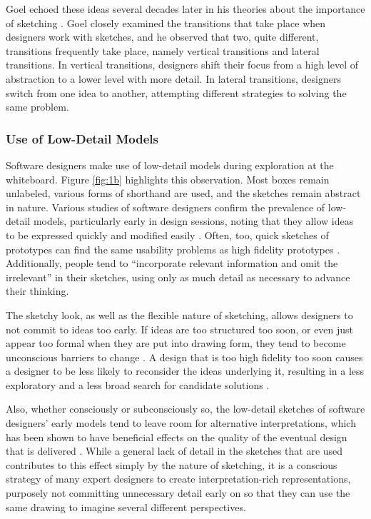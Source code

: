 Goel echoed these ideas several decades later in his theories about the importance of sketching \citep{Goel}. Goel closely examined the transitions that take place when designers work with sketches, and he observed that two, quite different, transitions frequently take place, namely vertical transitions and lateral transitions. In vertical transitions, designers shift their focus from a high level of abstraction to a lower level with more detail. In lateral transitions, designers switch from one idea to another, attempting different strategies to solving the same problem.

\subsubsection{Use of Low-Detail Models}
\label{behaviorsofsoftwaredesignerswhilesketching:2}
Software designers make use of low-detail models during exploration at the whiteboard. Figure \ref{fig:1b} highlights this observation. Most boxes remain unlabeled, various forms of shorthand are used, and the sketches remain abstract in nature. Various studies of software designers confirm the prevalence of low-detail models, particularly early in design sessions, noting that they allow ideas to be expressed quickly and modified easily \citep{cherubini2007let,petre2009insights}. Often, too, quick sketches of prototypes can find the same usability problems as high fidelity prototypes \citep{virzi1996usability}. Additionally, people tend to ``incorporate relevant information and omit the irrelevant'' \citep{tversky2002sketches} in their sketches, using only as much detail as necessary to advance their thinking.

The sketchy look, as well as the flexible nature of sketching, allows designers to not commit to ideas too early. If ideas are too structured too soon, or even just appear too formal when they are put into drawing form, they tend to become unconscious barriers to change \citep{wong1992rough}. A design that is too high fidelity too soon causes a designer to be less likely to reconsider the ideas underlying it, resulting in a less exploratory and a less broad search for candidate solutions \citep{wong1992rough}.

Also, whether consciously or subconsciously so, the low-detail sketches of software designers' early models tend to leave room for alternative interpretations, which has been shown to have beneficial effects on the quality of the eventual design that is delivered \citep{Goel,Yamamoto}. While a general lack of detail in the sketches that are used contributes to this effect simply by the nature of sketching, it is a conscious strategy of many expert designers to create interpretation-rich representations, purposely not committing unnecessary detail early on so that they can use the same drawing to imagine several different perspectives. 

